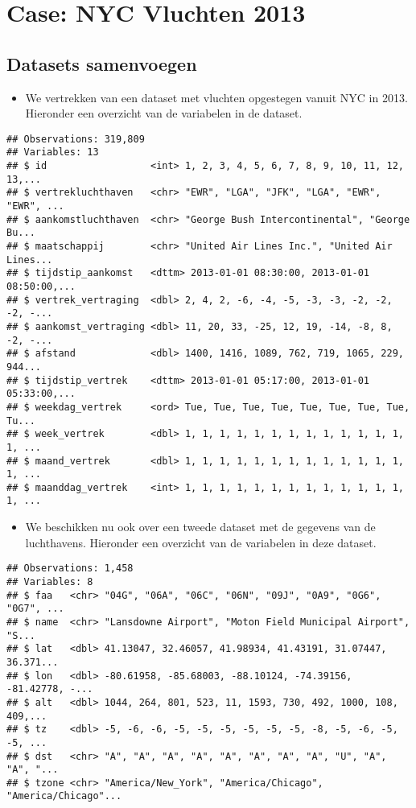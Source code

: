 \documentclass[]{memoir}
\providecommand{\tightlist}{%
  \setlength{\itemsep}{0pt}\setlength{\parskip}{0pt}}
\begin{document}
\hypertarget{case-nyc-vluchten-2013-3}{%
\section{Case: NYC Vluchten 2013}\label{case-nyc-vluchten-2013-3}}

\hypertarget{datasets-samenvoegen}{%
\subsection{Datasets samenvoegen}\label{datasets-samenvoegen}}

\begin{itemize}
\tightlist
\item
  We vertrekken van een dataset met vluchten opgestegen vanuit NYC in 2013. Hieronder een overzicht van de variabelen in de dataset.
\end{itemize}

\begin{verbatim}
## Observations: 319,809
## Variables: 13
## $ id                  <int> 1, 2, 3, 4, 5, 6, 7, 8, 9, 10, 11, 12, 13,...
## $ vertrekluchthaven   <chr> "EWR", "LGA", "JFK", "LGA", "EWR", "EWR", ...
## $ aankomstluchthaven  <chr> "George Bush Intercontinental", "George Bu...
## $ maatschappij        <chr> "United Air Lines Inc.", "United Air Lines...
## $ tijdstip_aankomst   <dttm> 2013-01-01 08:30:00, 2013-01-01 08:50:00,...
## $ vertrek_vertraging  <dbl> 2, 4, 2, -6, -4, -5, -3, -3, -2, -2, -2, -...
## $ aankomst_vertraging <dbl> 11, 20, 33, -25, 12, 19, -14, -8, 8, -2, -...
## $ afstand             <dbl> 1400, 1416, 1089, 762, 719, 1065, 229, 944...
## $ tijdstip_vertrek    <dttm> 2013-01-01 05:17:00, 2013-01-01 05:33:00,...
## $ weekdag_vertrek     <ord> Tue, Tue, Tue, Tue, Tue, Tue, Tue, Tue, Tu...
## $ week_vertrek        <dbl> 1, 1, 1, 1, 1, 1, 1, 1, 1, 1, 1, 1, 1, 1, ...
## $ maand_vertrek       <dbl> 1, 1, 1, 1, 1, 1, 1, 1, 1, 1, 1, 1, 1, 1, ...
## $ maanddag_vertrek    <int> 1, 1, 1, 1, 1, 1, 1, 1, 1, 1, 1, 1, 1, 1, ...
\end{verbatim}

\begin{itemize}
\tightlist
\item
  We beschikken nu ook over een tweede dataset met de gegevens van de luchthavens. Hieronder een overzicht van de variabelen in deze dataset.
\end{itemize}

\begin{verbatim}
## Observations: 1,458
## Variables: 8
## $ faa   <chr> "04G", "06A", "06C", "06N", "09J", "0A9", "0G6", "0G7", ...
## $ name  <chr> "Lansdowne Airport", "Moton Field Municipal Airport", "S...
## $ lat   <dbl> 41.13047, 32.46057, 41.98934, 41.43191, 31.07447, 36.371...
## $ lon   <dbl> -80.61958, -85.68003, -88.10124, -74.39156, -81.42778, -...
## $ alt   <dbl> 1044, 264, 801, 523, 11, 1593, 730, 492, 1000, 108, 409,...
## $ tz    <dbl> -5, -6, -6, -5, -5, -5, -5, -5, -5, -8, -5, -6, -5, -5, ...
## $ dst   <chr> "A", "A", "A", "A", "A", "A", "A", "A", "U", "A", "A", "...
## $ tzone <chr> "America/New_York", "America/Chicago", "America/Chicago"...
\end{verbatim}
\end{document}
